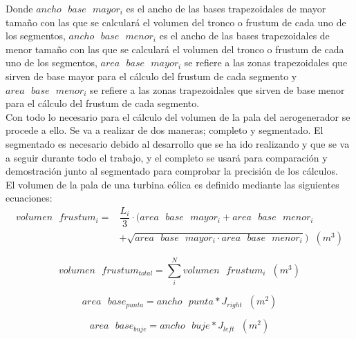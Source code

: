 Donde $ancho \text{ } base \text{ } mayor_i$ es el ancho de las bases trapezoidales de mayor tamaño con las que se calculará el volumen del tronco o frustum de cada uno de los segmentos,  $ancho \text{ } base \text{ } menor_i$ es el ancho de las bases trapezoidales de menor tamaño con las que se calculará el volumen del tronco o frustum de cada uno de los segmentos, $ area \text{ } base \text{ } mayor_i $ se refiere a las zonas trapezoidales que sirven de base mayor para el cálculo del frustum de cada segmento y $ area \text{ } base \text{ } menor_i $ se refiere a las zonas trapezoidales que sirven de base menor para el cálculo del frustum de cada segmento.\\


Con todo lo necesario para el cálculo del volumen de la pala del aerogenerador se procede a ello. Se va a realizar de dos maneras; completo y segmentado. El segmentado es necesario debido al desarrollo que se ha ido realizando y que se va a seguir durante todo el trabajo, y el completo se usará para comparación y demostración junto al segmentado para comprobar la precisión de los cálculos.\\

El volumen de la pala de una turbina eólica es definido mediante las siguientes ecuaciones:
\begin{equation}
    \begin{split}
        volumen \text{ } frustum_i = & \dfrac{L_i}{3} \cdot (area \text{ } base \text{ } mayor_i + area \text{ } base \text{ } menor_i \\
        & + \sqrt{area \text{ } base \text{ } mayor_i \cdot area \text{ } base \text{ } menor_i}) \hspace{7pt} (m^3)
    \end{split}
\end{equation}

\begin{equation}
 volumen \text{ } frustum_{total} = \sum_{i}^{N}volumen \text{ } frustum_i \hspace{7pt} (m^3)
\end{equation}

\begin{equation}
 area \text{ } base_{punta} = ancho \text{ } punta * J_{right} \hspace{7pt} (m^2)
 \end{equation}

 \begin{equation}
 area \text{ } base_{buje} = ancho \text{ } buje * J_{left} \hspace{7pt} (m^2)
 \end{equation}
 
